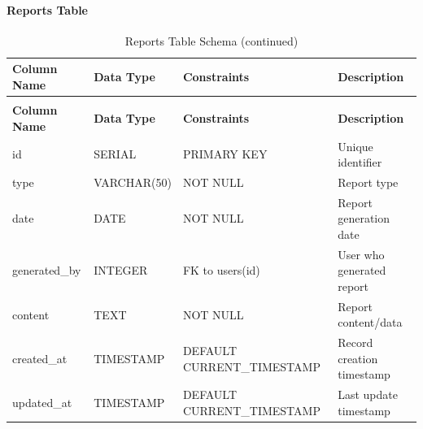 \documentclass[12pt,a4paper]{report}
\begin{document}
\paragraph{Reports Table}
\begin{longtable}{|p{3cm}|p{3cm}|p{2cm}|p{6cm}|}
\caption{Reports Table Schema}
\label{tab:reports}\\
\hline
\textbf{Column Name} & \textbf{Data Type} & \textbf{Constraints} & \textbf{Description} \\
\hline
\endfirsthead
\caption[]{Reports Table Schema (continued)}\\
\hline
\textbf{Column Name} & \textbf{Data Type} & \textbf{Constraints} & \textbf{Description} \\
\hline
\endhead
id & SERIAL & PRIMARY KEY & Unique identifier \\
\hline
type & VARCHAR(50) & NOT NULL & Report type \\
\hline
date & DATE & NOT NULL & Report generation date \\
\hline
generated\_by & INTEGER & FK to users(id) & User who generated report \\
\hline
content & TEXT & NOT NULL & Report content/data \\
\hline
created\_at & TIMESTAMP & DEFAULT CURRENT\_TIMESTAMP & Record creation timestamp \\
\hline
updated\_at & TIMESTAMP & DEFAULT CURRENT\_TIMESTAMP & Last update timestamp \\
\hline
\end{longtable}
\end{document}
